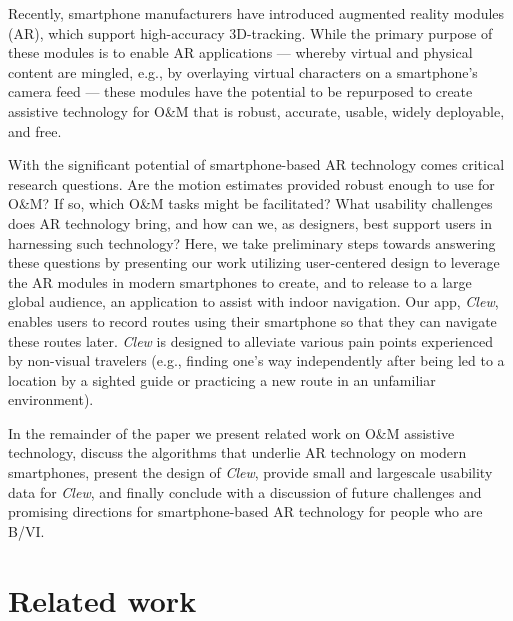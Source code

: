\documentclass[chi_draft]{sigchi}
\newcommand{\BVI}{B/VI\xspace}
\newcommand{\OM}{O\&M\xspace}
\begin{document}
Recently, smartphone manufacturers have introduced augmented reality modules (AR), which support high-accuracy 3D-tracking.  While the primary purpose of these modules is to enable AR applications --- whereby virtual and physical content are mingled, e.g., by overlaying virtual characters on a smartphone's camera feed --- these modules have the potential to be repurposed to create assistive technology for \OM that is robust, accurate, usable, widely deployable, and free.

With the significant potential of smartphone-based AR technology comes critical research questions.  Are the motion estimates provided robust enough to use for \OM? If so, which \OM tasks might be facilitated?  What usability challenges does AR technology bring, and how can we, as designers, best support users in harnessing such technology?  Here, we take preliminary steps towards answering these questions by presenting our work utilizing user-centered design to leverage the AR modules in modern smartphones to create, and to release to a large global audience, an application to assist with indoor navigation.  Our app, \emph{Clew}, enables users to record routes using their smartphone so that they can navigate these routes later.  \emph{Clew} is designed to alleviate various pain points experienced by non-visual travelers (e.g., finding one's way independently after being led to a location by a sighted guide or practicing a new route in an unfamiliar environment).%

In the remainder of the paper we present related work on \OM assistive technology, discuss the algorithms that underlie AR technology on modern smartphones, present the design of \emph{Clew}, provide small and largescale usability data for \emph{Clew}, and finally conclude with a discussion of future challenges and promising directions for smartphone-based AR technology for people who are \BVI.

\section{Related work}
\end{document}
